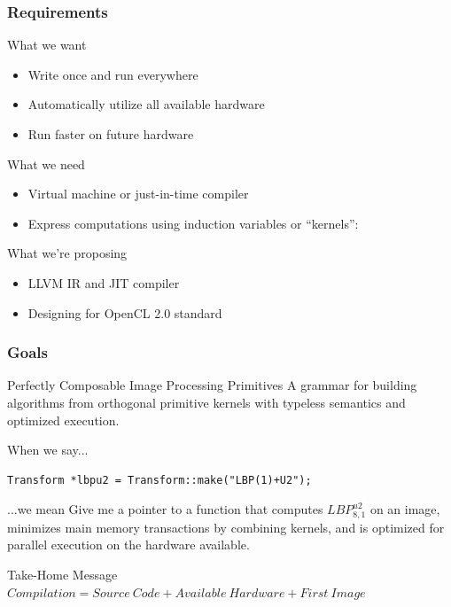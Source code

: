 \documentclass[12pt]{beamer}
\begin{document}
\begin{frame}
\frametitle{Requirements}
\begin{block}{What we want}
  \begin{itemize}
  \item Write once and run everywhere
  \item Automatically utilize all available hardware
  \item Run faster on future hardware
  \end{itemize}
\end{block}
\pause
\begin{block}{What we need}
  \begin{itemize}
  \item Virtual machine or just-in-time compiler
  \item Express computations using induction variables or ``kernels'': \\
  \end{itemize}
\end{block}
\pause
\begin{block}{What we're proposing}
  \begin{itemize}
  \item LLVM IR and JIT compiler
  \item Designing for OpenCL 2.0 standard
  \end{itemize}
\end{block}
\end{frame}

\begin{frame}[fragile]
\frametitle{Goals}
\begin{block}{Perfectly Composable Image Processing Primitives}
A grammar for building algorithms from orthogonal primitive kernels with typeless semantics and optimized execution.
\end{block}
\pause
\begin{block}{When we say...}
\begin{verbatim}
Transform *lbpu2 = Transform::make("LBP(1)+U2");
\end{verbatim}
\end{block}
\pause
\begin{block}{...we mean}
Give me a pointer to a function that computes $LBP_{8,1}^{u2}$ on an image,
minimizes main memory transactions by combining kernels,
and is optimized for parallel execution on the hardware available.
\end{block}
\pause
\begin{exampleblock}{Take-Home Message}
$Compilation = Source\ Code + Available\ Hardware + First\ Image$
\end{exampleblock}
\end{frame}
\end{document}
